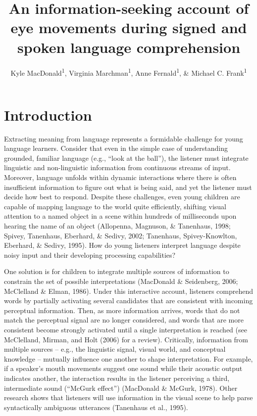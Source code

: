\documentclass[english,floatsintext,man]{apa6}
\title{An information-seeking account of eye movements during signed and spoken
language comprehension}
\author{Kyle MacDonald\textsuperscript{1}, Virginia Marchman\textsuperscript{1}, Anne Fernald\textsuperscript{1}, \& Michael C. Frank\textsuperscript{1}}
\affiliation{
    \vspace{0.5cm}
          \textsuperscript{1} Stanford University  }
\begin{document}
\maketitle

\setcounter{secnumdepth}{0}



\hypertarget{introduction}{%
\section{Introduction}\label{introduction}}

Extracting meaning from language represents a formidable challenge for
young language learners. Consider that even in the simple case of
understanding grounded, familiar language (e.g., \enquote{look at the
ball}), the listener must integrate linguistic and non-linguistic
information from continuous streams of input. Moreover, language unfolds
within dynamic interactions where there is often insufficient
information to figure out what is being said, and yet the listener must
decide how best to respond. Despite these challenges, even young
children are capable of mapping language to the world quite efficiently,
shifting visual attention to a named object in a scene within hundreds
of milliseconds upon hearing the name of an object (Allopenna, Magnuson,
\& Tanenhaus, 1998; Spivey, Tanenhaus, Eberhard, \& Sedivy, 2002;
Tanenhaus, Spivey-Knowlton, Eberhard, \& Sedivy, 1995). How do young
listeners interpret language despite noisy input and their developing
processing capabilities?

One solution is for children to integrate multiple sources of
information to constrain the set of possible interpretations (MacDonald
\& Seidenberg, 2006; McClelland \& Elman, 1986). Under this interactive
account, listeners comprehend words by partially activating several
candidates that are consistent with incoming perceptual information.
Then, as more information arrives, words that do not match the
perceptual signal are no longer considered, and words that are more
consistent become strongly activated until a single interpretation is
reached (see McClelland, Mirman, and Holt (2006) for a review).
Critically, information from multiple sources -- e.g., the linguistic
signal, visual world, and conceptual knowledge -- mutually influence one
another to shape interpretation. For example, if a speaker's mouth
movements suggest one sound while their acoustic output indicates
another, the interaction results in the listener perceiving a third,
intermediate sound (\enquote{McGurk effect}) (MacDonald \& McGurk,
1978). Other research shows that listeners will use information in the
visual scene to help parse syntactically ambiguous utterances (Tanenhaus
et al., 1995).
\end{document}
